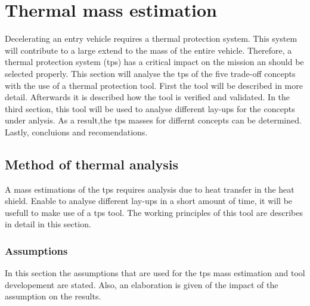 \section{Thermal mass estimation}
\label{ch:thermtool}
Decelerating an entry vehicle requires a thermal protection system. This system will contribute to a large extend to the mass of the entire vehicle. Therefore, a thermal protection system (\gls{tps}) has a critical impact on the mission an should be selected properly. This section will analyse the \gls{tps} of the five trade-off concepts with the use of a thermal protection tool. First the tool will be described in more detail. Afterwards it is described how the tool is verified and validated. In the third section, this tool will be used to analyse different lay-ups for the concepts under anlysis. As a result,the \gls{tps} masses for differnt concepts can be determined. Lastly, concluions and recomendations.

\subsection{Method of thermal analysis}
A mass estimations of the \gls{tps} requires analysis due to heat transfer in the heat shield. Enable to analyse different lay-ups in a short amount of time, it will be usefull to make use of a \gls{tps} tool. The working principles of this tool are describes in detail in this section.

\subsubsection{Assumptions}
In this section the assumptions that are used for the \gls{tps} mass estimation and tool developement are stated. Also, an elaboration is given of the impact of the assumption on the results.

